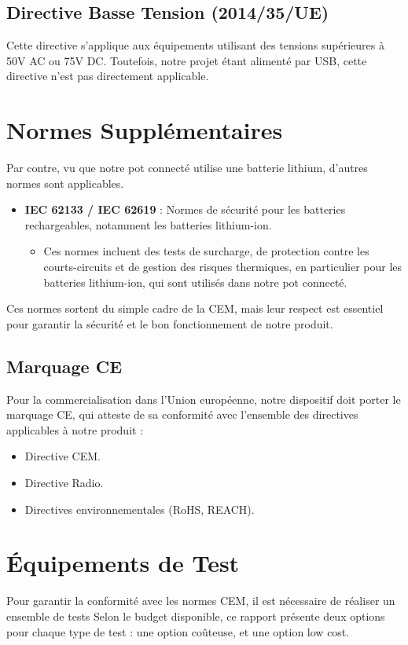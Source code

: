 \documentclass[a4paper,12pt]{article}
\begin{document}
\subsection{Directive Basse Tension (2014/35/UE)}
Cette directive s'applique aux équipements utilisant des tensions supérieures à 50V AC ou 75V DC. Toutefois, notre projet étant alimenté par USB, cette directive n'est pas directement applicable.
\section{Normes Supplémentaires}
Par contre, vu que notre pot connecté utilise une batterie lithium, d'autres normes sont applicables.
\begin{itemize}
    \item \textbf{IEC 62133 / IEC 62619} : Normes de sécurité pour les batteries rechargeables, notamment les batteries lithium-ion.
          \begin{itemize}
              \item Ces normes incluent des tests de surcharge, de protection contre les courts-circuits et de gestion des risques thermiques, en particulier pour les batteries lithium-ion, qui sont utilisés dans notre pot connecté.
          \end{itemize}
\end{itemize}
Ces normes sortent du simple cadre de la CEM, mais leur respect est essentiel pour garantir la sécurité et le bon fonctionnement de notre produit.
\subsection{Marquage CE}
Pour la commercialisation dans l'Union européenne, notre dispositif doit porter le marquage CE, qui atteste de sa conformité avec l'ensemble des directives applicables à notre produit :
\begin{itemize}
    \item Directive CEM.
    \item Directive Radio.
    \item Directives environnementales (RoHS, REACH).
\end{itemize}

\newpage

\section{Équipements de Test}
Pour garantir la conformité avec les normes CEM, il est nécessaire de réaliser un ensemble de tests Selon le budget disponible, ce rapport présente deux options pour chaque type de test : une option coûteuse, et une option low cost.
\end{document}

